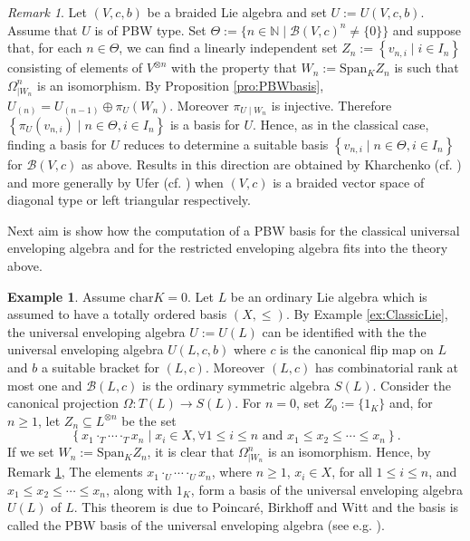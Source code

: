 \documentclass[english]{amsart}
\numberwithin{equation}{section}
\numberwithin{figure}{section}
\theoremstyle{plain}
\theoremstyle{definition}
\theoremstyle{definition}
\newtheorem{example}[thm]{Example}
\theoremstyle{remark}
\theoremstyle{remark}
\newtheorem{rem}[thm]{Remark}
\theoremstyle{plain}
\theoremstyle{plain}
\theoremstyle{plain}
\begin{document}
\begin{rem}
\label{rem:PBWbasis}Let $\left(V,c,b\right)$ be a braided Lie algebra
and set $U:=U\left(V,c,b\right)$. Assume that $U$ is of PBW type.
Set $\Theta:=\{n\in\mathbb{N}\mid\mathcal{B}\left(V,c\right)^{n}\neq\{0\}\}$
and suppose that, for each $n\in\Theta$, we can find a linearly independent
set $Z_{n}:=\left\{ v_{n,i}\mid i\in I_{n}\right\} $ consisting of
elements of $V^{\otimes n}$ with the property that $W_{n}:=\mathrm{Span}{}_{K}Z_{n}$
is such that $\Omega_{\mid W_{n}}^{n}$ is an isomorphism. By Proposition
\ref{pro:PBWbasis}, $U_{\left(n\right)}=U_{\left(n-1\right)}\oplus\pi_{U}(W_{n})$.
Moreover $\pi_{U\mid W_{n}}$ is injective. Therefore $\left\{ \pi_{U}\left(v_{n,i}\right)\mid n\in\Theta,i\in I_{n}\right\} $
is a basis for $U$. Hence, as in the classical case, finding a basis
for $U$ reduces to determine a suitable basis $\left\{ v_{n,i}\mid n\in\Theta,i\in I_{n}\right\} $
for $\mathcal{B}\left(V,c\right)$ as above. Results in this direction
are obtained by Kharchenko (cf. \cite[Theorem 2]{Kherchenko-Aquantum})
and more generally by Ufer (cf. \cite[Theorem 34]{Ufer}) when $(V,c)$
is a braided vector space of diagonal type or left triangular respectively.
\end{rem}
Next aim is show how the computation of a PBW basis for the classical
universal enveloping algebra and for the restricted enveloping algebra
fits into the theory above.
\begin{example}
\label{exa:PBWbasis-char0}Assume $\mathrm{char}K=0$. Let $L$ be
an ordinary Lie algebra which is assumed to have a totally ordered
basis $(X,\leq)$. By Example \ref{ex:ClassicLie}, the universal
enveloping algebra $U:=U(L)$ can be identified with the the universal
enveloping algebra $U(L,c,b)$ where $c$ is the canonical flip map
on $L$ and $b$ a suitable bracket for $(L,c)$. Moreover $(L,c)$
has combinatorial rank at most one and $\mathcal{B}\left(L,c\right)$
is the ordinary symmetric algebra $S(L)$. Consider the canonical
projection $\Omega:T\left(L\right)\rightarrow S\left(L\right)$. For
$n=0$, set $Z_{0}:=\{1_{K}\}$ and, for $n\geq1$, let $Z_{n}\subseteq L^{\otimes n}$
be the set \[
\left\{ x_{1}\cdot_{T}\cdots\cdot_{T}x_{n}\mid x_{i}\in X,\forall1\leq i\leq n\text{ and }x_{1}\leq x_{2}\leq\cdots\leq x_{n}\right\} .\]
If we set $W_{n}:=\mathrm{Span}{}_{K}Z_{n}$, it is clear that $\Omega_{\mid W_{n}}^{n}$
is an isomorphism. Hence, by Remark \ref{rem:PBWbasis}, The elements
$x_{1}\cdot_{U}\cdots\cdot_{U}x_{n}$, where $n\geq1$, $x_{i}\in X$,
for all $1\leq i\leq n$, and $x_{1}\leq x_{2}\leq\cdots\leq x_{n}$,
along with $1_K$, form a basis of the universal enveloping algebra
$U(L)$ of $L$. This theorem is due to Poincaré, Birkhoff and Witt
and the basis is called the PBW basis of the universal enveloping
algebra (see e.g. \cite[Corollary C, page 92]{Humphreys}). \end{example}
\end{document}
